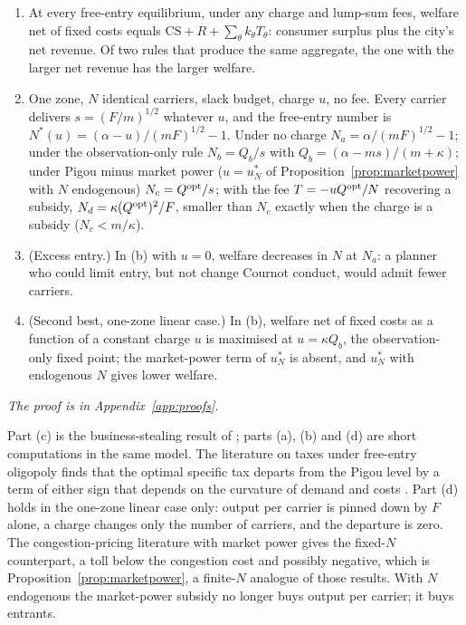 \begin{proposition}\label{prop:entry}
\begin{enumerate}
\item[(a)] At every free-entry equilibrium, under any charge and lump-sum fees, welfare net of fixed costs equals $\mathrm{CS}+R+\sum_\theta k_\theta T_\theta$: consumer surplus plus the city's net revenue. Of two rules that produce the same aggregate, the one with the larger net revenue has the larger welfare.
\item[(b)] One zone, $N$ identical carriers, slack budget, charge $u$, no fee. Every carrier delivers $s=(F/m)^{1/2}$ whatever $u$, and the free-entry number is $N^*(u)=(\alpha-u)/(mF)^{1/2}-1$. Under no charge $N_a=\alpha/(mF)^{1/2}-1$; under the observation-only rule $N_b=Q_b/s$ with $Q_b=(\alpha-ms)/(m+\kappa)$; under Pigou minus market power ($u=u^*_N$ of Proposition~\ref{prop:marketpower} with $N$ endogenous) $N_c=Q^{\mathrm{opt}}/s$; with the fee $T=-u Q^{\mathrm{opt}}/N$ recovering a subsidy, $N_d=\kappa(Q^{\mathrm{opt}})^2/F$, smaller than $N_c$ exactly when the charge is a subsidy ($N_c<m/\kappa$).
\item[(c)] (Excess entry.) In (b) with $u=0$, welfare decreases in $N$ at $N_a$: a planner who could limit entry, but not change Cournot conduct, would admit fewer carriers.
\item[(d)] (Second best, one-zone linear case.) In (b), welfare net of fixed costs as a function of a constant charge $u$ is maximised at $u=\kappa Q_b$, the observation-only fixed point; the market-power term of $u^*_N$ is absent, and $u^*_N$ with endogenous $N$ gives lower welfare.
\end{enumerate}
\end{proposition}
\emph{The proof is in Appendix~\ref{app:proofs}.}

Part (c) is the business-stealing result of \citet{MankiwWhinston1986}; parts (a), (b) and (d) are short computations in the same model. The literature on taxes under free-entry oligopoly finds that the optimal specific tax departs from the Pigou level by a term of either sign that depends on the curvature of demand and costs \citep{Konishi1990,KatsoulacosXepapadeas1995,Hamada2022}. Part (d) holds in the one-zone linear case only: output per carrier is pinned down by $F$ alone, a charge changes only the number of carriers, and the departure is zero. The congestion-pricing literature with market power \citep{Brueckner2002,PelsVerhoef2004} gives the fixed-$N$ counterpart, a toll below the congestion cost and possibly negative, which is Proposition~\ref{prop:marketpower}, a finite-$N$ analogue of those results. With $N$ endogenous the market-power subsidy no longer buys output per carrier; it buys entrants.

